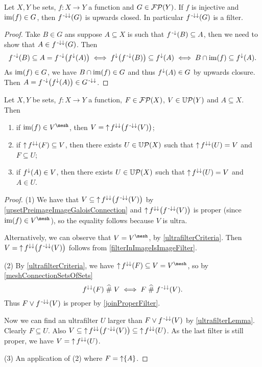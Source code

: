 \begin{lemma}
Let $X, Y$ be sets, $f: X\to Y$ a function and $G\in\operatorname{\mathcal{FP}}(Y)$. If $f$ is injective and $\operatorname{im}(f)\in G$, then $f^{{\text{\hspace{0.15em}-}\downarrow}\downarrow}(G)$ is upwards closed. In particular $f^{{\text{\hspace{0.15em}-}\downarrow}\downarrow}(G)$ is a filter.
\end{lemma}
\begin{proof}
Take $B\in G$ ans suppose $A\subseteq X$ is such that $f^{\text{\hspace{0.15em}-}\downarrow}(B)\subseteq A$, then we need to show that $A\in f^{{\text{\hspace{0.15em}-}\downarrow}\downarrow}(G)$. Then
\[ f^{\text{\hspace{0.15em}-}\downarrow}(B)\subseteq A = f^{{\text{\hspace{0.15em}-}\downarrow}}\big(f^\downarrow(A)\big) \iff f^\downarrow\big(f^{\text{\hspace{0.15em}-}\downarrow}(B)\big) \subseteq f^\downarrow(A) \iff B\cap \operatorname{im}(f) \subseteq f^\downarrow(A).  \]
As $\operatorname{im}(f)\in G$, we have $B\cap \operatorname{im}(f)\in G$ and thus $f^{\downarrow}(A)\in G$ by upwards closure. Then $A = f^{{\text{\hspace{0.15em}-}\downarrow}}\big(f^\downarrow(A)\big) \in G^{{\text{\hspace{0.15em}-}\downarrow}\downarrow}$.
\end{proof}

\begin{lemma} \label{mappingUltrafiltersLemma}
Let $X,Y$ be sets, $f: X\to Y$ a function, $F\in\operatorname{\mathcal{FP}}(X)$, $V\in \operatorname{\mathbb{U}\mathcal{P}}(Y)$ and $A\subseteq X$. Then
\begin{enumerate}
\item if $\im(f)\in V^\mesh$, then $V = \operatorname{\uparrow} f^{\downarrow\downarrow}\big(f^{{\text{\hspace{0.15em}-}\downarrow}\downarrow}(V)\big)$;
\item if $\operatorname{\uparrow} f^{\downarrow\downarrow}(F)\subseteq V$, then there exists $U\in \operatorname{\mathbb{U}\mathcal{P}}(X)$ such that $\operatorname{\uparrow} f^{\downarrow\downarrow}(U) = V$ and $F\subseteq U$;
\item if $f^{\downarrow}(A)\in V$, then there exists $U\in \operatorname{\mathbb{U}\mathcal{P}}(X)$ such that $\operatorname{\uparrow} f^{\downarrow\downarrow}(U) = V$ and $A\in U$.
\end{enumerate}
\end{lemma}
\begin{proof}
(1) We have that $V \subseteq \operatorname{\uparrow} f^{\downarrow\downarrow}\big(f^{{\text{\hspace{0.15em}-}\downarrow}\downarrow}(V)\big)$ by \ref{upsetPreimageImageGaloisConnection} and $\operatorname{\uparrow} f^{\downarrow\downarrow}\big(f^{{\text{\hspace{0.15em}-}\downarrow}\downarrow}(V)\big)$ is proper (since $\im(f)\in V^\mesh$), so the equality follows because $V$ is ultra.

Alternatively, we can observe that $V = V^\mesh$, by \ref{ultrafilterCriteria}. Then $V = \operatorname{\uparrow} f^{\downarrow\downarrow}\big(f^{{\text{\hspace{0.15em}-}\downarrow}\downarrow}(V)\big)$ follows from \ref{filterInImageIsImageFilter}.

(2) By \ref{ultrafilterCriteria}, we have $\upset f^{\imf\imf}(F)\subseteq V = V^\mesh$, so by \ref{meshConnectionSetsOfSets}
\[ f^{\downarrow\downarrow}(F) \mathrel{\widehat{\#}} V \iff F\mathrel{\widehat{\#}} f^{{\text{\hspace{0.15em}-}\downarrow}\downarrow}(V). \]
Thus $F\vee f^{{\text{\hspace{0.15em}-}\downarrow}\downarrow}(V)$ is proper by \ref{joinProperFilter}.

Now we can find an ultrafilter $U$ larger than $F\vee f^{{\text{\hspace{0.15em}-}\downarrow}\downarrow}(V)$ by \ref{ultrafilterLemma}. Clearly $F\subseteq U$. Also $V \subseteq \operatorname{\uparrow} f^{\downarrow\downarrow}\big(f^{{\text{\hspace{0.15em}-}\downarrow}\downarrow}(V)\big) \subseteq \operatorname{\uparrow} f^{\downarrow\downarrow}(U)$. As the last filter is still proper, we have $V = \operatorname{\uparrow} f^{\downarrow\downarrow}(U)$.

(3) An application of (2) where $F = \operatorname{\uparrow} \{A\}$.
\end{proof}

